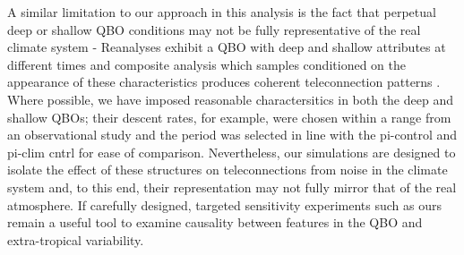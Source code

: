 A similar limitation to our approach in this analysis is the fact that perpetual deep or shallow QBO conditions may not be fully representative of the real climate system - Reanalyses exhibit a QBO with deep and shallow attributes at different times and composite analysis which samples conditioned on the appearance of these characteristics produces coherent teleconnection patterns \citep{andrewsObserved2019d}. Where possible, we have imposed reasonable charactersitics in both the deep and shallow QBOs; their descent rates, for example, were chosen within a range from an observational study \citep{kinnersleyDescent1996} and the period was selected in line with the pi-control and pi-clim cntrl for ease of comparison. Nevertheless, our simulations are designed to isolate the effect of these structures on teleconnections from noise in the climate system and, to this end, their representation may not fully mirror that of the real atmosphere. If carefully designed, targeted sensitivity experiments such as ours remain a useful tool to examine causality between features in the QBO and extra-tropical variability.
